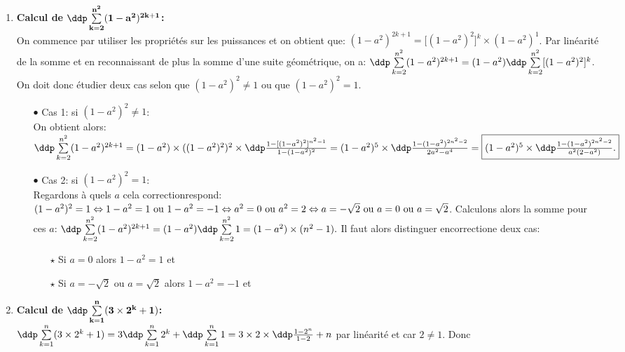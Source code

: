 \begin{correction}
\begin{enumerate}
Une autre solution consiste à faire la somme des paires entre $1$ et $2n$ puis simplifier l'expression avec la somme de tous les entiers au cube. 
\item  \textbf{Calcul de $\mathbf{\ddp \sum\limits_{k=2}^{n^2} (1-a^2)^{2k+1}}$:}\\
\noindent On commence par utiliser les propri\'et\'es sur les puissances et on obtient que: $(1-a^2)^{2k+1}=\lbrack(1-a^2)^2\rbrack^k \times (1-a^2)^1$. Par lin\'earit\'e de la somme et en reconnaissant de plus la somme d'une suite g\'eom\'etrique, on a: $\ddp \sum\limits_{k=2}^{n^2} (1-a^2)^{2k+1}=(1-a^2)\ddp \sum\limits_{k=2}^{n^2} \lbrack (1-a^2)^2 \rbrack^k$. On doit donc \'etudier deux cas selon que $(1-a^2)^2\not= 1$ ou que $(1-a^2)^2= 1$.
\begin{itemize}
\item[$\bullet$] Cas 1: si $(1-a^2)^2\not= 1$:\\
\noindent On obtient alors: $\ddp \sum\limits_{k=2}^{n^2} (1-a^2)^{2k+1}=(1-a^2)\times ((1-a^2)^2)^2\times \ddp\frac{1-\lbrack (1-a^2)^2\rbrack^{n^2-1}}{1-(1-a^2)^2}=(1-a^2)^5\times \ddp\frac{1- (1-a^2)^{2n^2-2}}{2a^2-a^4}=\fbox{$(1-a^2)^5\times \ddp\frac{1- (1-a^2)^{2n^2-2}}{a^2(2-a^2)}$.}$
\item[$\bullet$] Cas 2: si $(1-a^2)^2= 1$:\\
\noindent Regardons \`{a} quels $a$ cela correctionrespond: $(1-a^2)^2= 1\Leftrightarrow 1-a^2=1\ \hbox{ou}\ 1-a^2=-1\Leftrightarrow a^2=0\ \hbox{ou}\ a^2=2\Leftrightarrow a=-\sqrt{2}\ \hbox{ou}\ a=0\ \hbox{ou}\ a=\sqrt{2}$. Calculons alors la somme pour ces $a$: $\ddp \sum\limits_{k=2}^{n^2} (1-a^2)^{2k+1}=(1-a^2)\ddp \sum\limits_{k=2}^{n^2} 1=(1-a^2)\times (n^2-1).$ Il faut alors distinguer encorrectione deux cas: 
\begin{itemize}
\item[$\star$] Si $a=0$ alors $1-a^2=1$ et 
\item[$\star$] Si $a=-\sqrt{2}$ ou $a=\sqrt{2}$ alors $1-a^2=-1$ et 
\end{itemize}
\end{itemize}
\item  \textbf{Calcul de $\mathbf{\ddp \sum\limits_{k=1}^n (3\times 2^k+1) }$:}\\
\noindent $\ddp \sum\limits_{k=1}^n (3\times 2^k+1)=3 \ddp \sum\limits_{k=1}^n 2^k+\ddp \sum\limits_{k=1}^n 1=3\times 2\times \ddp\frac{1-2^n}{1-2} +n $ par lin\'earit\'e et car $2\not=1$. Donc 
\begin{center}
\end{center}


\end{enumerate}
\end{correction}

